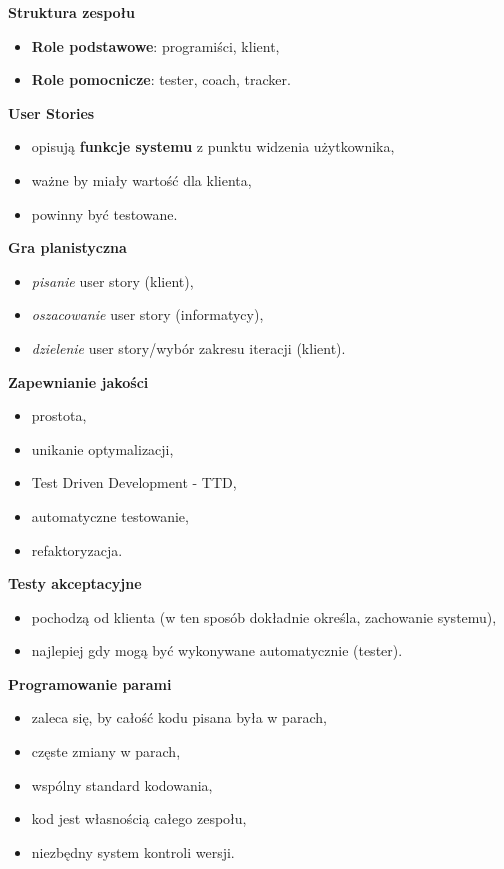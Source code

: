 \documentclass[a4paper]{article}
\begin{document}
    \textbf{Struktura zespołu}
    \begin{itemize}
        \item \textbf{Role podstawowe}: programiści, klient,
        \item \textbf{Role pomocnicze}: tester, coach, tracker.
    \end{itemize}

    \textbf{User Stories}
    \begin{itemize}
        \item opisują \textbf{funkcje systemu} z punktu widzenia użytkownika,
        \item ważne by miały wartość dla klienta,
        \item powinny być testowane.
    \end{itemize}

    \textbf{Gra planistyczna}
    \begin{itemize}
        \item \textit{pisanie} user story (klient),
        \item \textit{oszacowanie} user story (informatycy),
        \item \textit{dzielenie} user story/wybór zakresu iteracji (klient).
    \end{itemize}

    \textbf{Zapewnianie jakości}
    \begin{itemize}
        \item prostota,
        \item unikanie optymalizacji,
        \item Test Driven Development - TTD,
        \item automatyczne testowanie,
        \item refaktoryzacja.
    \end{itemize}

    \textbf{Testy akceptacyjne}
    \begin{itemize}
        \item pochodzą od klienta (w ten sposób dokładnie określa,
        zachowanie systemu),
        \item najlepiej gdy mogą być wykonywane automatycznie (tester).
    \end{itemize}

    \textbf{Programowanie parami}
    \begin{itemize}
        \item zaleca się, by całość kodu pisana była w parach,
        \item częste zmiany w parach,
        \item wspólny standard kodowania,
        \item kod jest własnością całego zespołu,
        \item niezbędny system kontroli wersji.
    \end{itemize}
\end{document}
